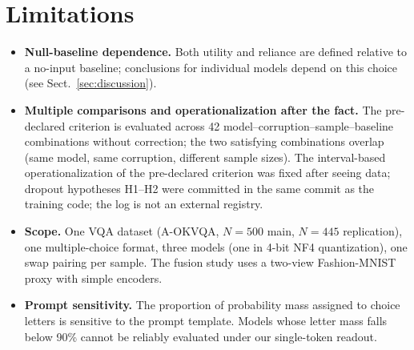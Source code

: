 \section{Limitations}
\label{sec:limitations}

\begin{itemize}
\item \textbf{Null-baseline dependence.} Both utility and reliance are
  defined relative to a no-input baseline; conclusions for individual
  models depend on this choice (see Sect.~\ref{sec:discussion}).

\item \textbf{Multiple comparisons and operationalization after the fact.} The
  pre-declared criterion is evaluated across 42
  model--corruption--sample--baseline combinations without correction; the
  two satisfying combinations overlap (same model, same corruption, different
  sample sizes). The interval-based operationalization of the pre-declared
  criterion was fixed after seeing data; dropout hypotheses H1--H2 were
  committed in the same commit as the training code; the log is not an external
  registry.

\item \textbf{Scope.} One VQA dataset (A-OKVQA, $N=500$ main,
  $N=445$ replication), one multiple-choice format, three models (one in
  4-bit NF4 quantization), one swap pairing per sample. The fusion study
  uses a two-view Fashion-MNIST proxy with simple encoders.

\item \textbf{Prompt sensitivity.} The proportion of probability mass
  assigned to choice letters is sensitive to the prompt template. Models
  whose letter mass falls below 90\% cannot be reliably evaluated under
  our single-token readout.
\end{itemize}
